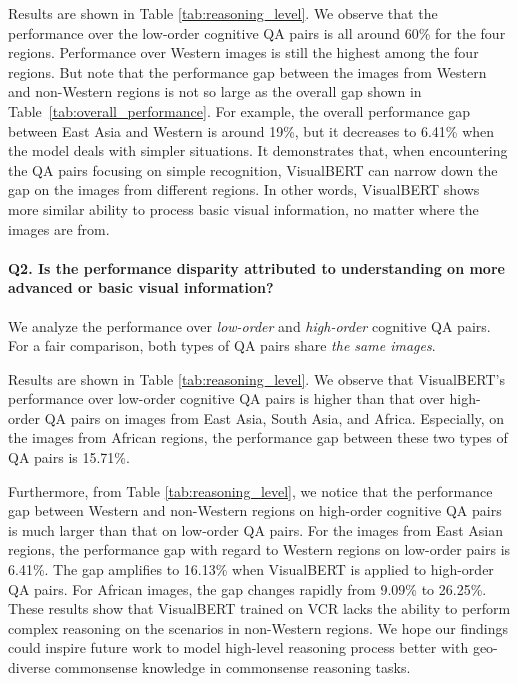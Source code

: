 \documentclass[11pt]{article}
\begin{document}
Results are shown in Table \ref{tab:reasoning_level}. We observe that the performance over the low-order cognitive QA pairs is all around 60\% for the four regions. Performance over Western images is still the highest among the four regions. But note that the performance gap between the images from Western and non-Western regions is not so large as the overall gap shown in Table~\ref{tab:overall_performance}. For example, the overall performance gap between East Asia and Western is around 19\%, but it decreases to 6.41\% when the model deals with simpler situations. It demonstrates that, when encountering the QA pairs focusing on simple recognition, VisualBERT can narrow down the gap on the images from different regions. In other words, VisualBERT shows more similar ability to process basic visual information, no matter where the images are from.

\paragraph{Q2. Is the performance disparity attributed to understanding on more advanced or basic visual information?}
We analyze the performance over \emph{low-order} and \emph{high-order} cognitive QA pairs. For a fair comparison, both types of QA pairs share \emph{the same images}.

Results are shown in Table \ref{tab:reasoning_level}. We observe that VisualBERT's performance over low-order cognitive QA pairs is higher than that over high-order QA pairs on images from East Asia, South Asia, and Africa. Especially, on the images from African regions, the performance gap between these two types of QA pairs is 15.71\%. 

Furthermore, from Table \ref{tab:reasoning_level}, we notice that the performance gap between Western and non-Western regions on high-order cognitive QA pairs is much larger than that on low-order QA pairs. For the images from East Asian regions, the performance gap with regard to Western regions on low-order pairs is 6.41\%. The gap amplifies to 16.13\% when VisualBERT is applied to high-order QA pairs. For African images, the gap changes rapidly from 9.09\% to 26.25\%. These results show that VisualBERT trained on VCR lacks the ability to perform complex reasoning on the scenarios in non-Western regions. We hope our findings could inspire future work to model high-level reasoning process better with geo-diverse commonsense knowledge in commonsense reasoning tasks.
\end{document}
